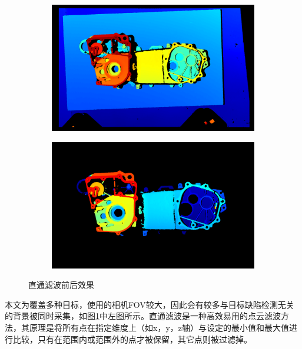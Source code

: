 \begin{figure}[htbp]
    \centering
    \begin{subfigure}
        \centering
        \includegraphics[width=.45\linewidth]{figures/xy_before_passthrough.png}  
      \end{subfigure}
      \begin{subfigure}
        \centering
        \includegraphics[width=.45\linewidth]{figures/z_xy_afterpassthrough.png} 
      \end{subfigure}
    \caption{直通滤波前后效果}
    \label{fig:xy}
\end{figure}

本文为覆盖多种目标，使用的相机FOV较大，因此会有较多与目标缺陷检测无关的背景被同时采集，如图\ref{fig:xy}中左图所示。直通滤波是一种高效易用的点云滤波方法，其原理是将所有点在指定维度上（如x，y，z轴）与设定的最小值和最大值进行比较，只有在范围内或范围外的点才被保留，其它点则被过滤掉。

